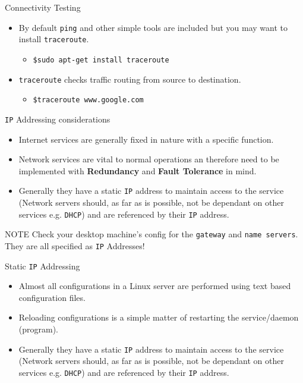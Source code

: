 \documentclass{beamer}
\begin{document}
\begin{frame}{Connectivity Testing}
  \begin{itemize}
    \item By default \texttt{ping} and other simple tools are included but you may want to install \texttt{traceroute}. 
      \begin{itemize}
        \item \texttt{\$sudo apt-get install traceroute}
      \end{itemize}
    \item \texttt{traceroute} checks traffic routing from source to destination.
      \begin{itemize}
        \item \texttt{\$traceroute www.google.com}
      \end{itemize}
  \end{itemize}
\end{frame}

\begin{frame}{\texttt{IP} Addressing considerations}
   \begin{itemize}
     \item Internet services are generally fixed in nature with a specific function. 
     \item Network services are vital to normal operations an therefore need to be implemented with \textbf{Redundancy} and \textbf{Fault Tolerance} in mind.
     \item Generally they have a static \texttt{IP} address to maintain access to the service (Network servers should, as far as is possible, not be dependant on other services e.g. \texttt{DHCP}) and are referenced by their \texttt{IP} address.
   \end{itemize}
   \begin{block}{NOTE}
     Check your desktop machine's config for the \texttt{gateway} and \texttt{name servers}. They are  all specified as \texttt{IP} Addresses!
   \end{block}
\end{frame}

\begin{frame}{Static \texttt{IP} Addressing}
  \begin{itemize}
    \item Almost all configurations in a Linux server are performed using text based configuration files.
    \item Reloading configurations is a simple matter of restarting the service/daemon (program).
    \item Generally they have a static \texttt{IP} address to maintain access to the service (Network servers should, as far as is possible, not be dependant on other services e.g. \texttt{DHCP}) and are referenced by their \texttt{IP} address.
  \end{itemize}
\end{frame}
\end{document}
